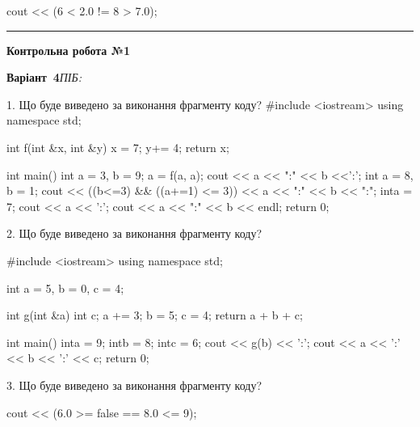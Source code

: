 \documentclass[11pt]{article}
\begin{document}
cout << (6 < 2.0 != 8 > 7.0);




\vspace{10mm}
\noindent\rule{\textwidth}{0.3pt}
\vspace{8mm}
{\large\textbf{Контрольна робота №1}}

\textbf{Варіант \No\,4}\hfill \textit{ПІБ:}\,\underline{\hspace{60mm}}
\vspace{4mm}

1. Що буде виведено за виконання фрагменту коду?
#include <iostream>
using namespace std;

int f(int &x, int &y){
    x = 7;
    y+= 4;
    return x;
}

int main(){
    int a = 3, b = 9;
    a = f(a, a);
    cout << a << ":" << b <<':';
    {
        int a = 8, b = 1;
        cout << ((b<=3) && ((a+=1) <= 3))
             << a << ":" << b << ":";
    }
    {
        inta = 7;
        cout << a << ':';
    }
    cout << a << ":" << b << endl;
    return 0;
}


2. Що буде виведено за виконання фрагменту коду?

#include <iostream>
using namespace std;

int a = 5, b = 0, c = 4;

int g(int &a){
int c;    a += 3;
    b = 5;
    c = 4;
    return a + b + c;
}

int main(){
    inta = 9;
    intb = 8;
    intc = 6;
    cout << g(b) << ':';
    cout << a << ':' << b << ':' << c;
    return 0; 
}

3. Що буде виведено за виконання фрагменту коду?

cout << (6.0 >= false == 8.0 <= 9);




\newpage
\end{document}
